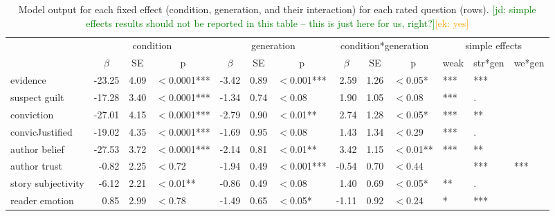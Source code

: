 \documentclass[10pt,letterpaper]{article}
\newcommand{\ek}[1]{\textcolor{Orange}{[ek: #1]}}
\newcommand{\jd}[1]{\textcolor{Green}{[jd: #1]}}
\begin{document}
	\begin{table}
		\centering
		\begin{tabular}{l r r l r r l r r l l l l}
			\toprule
			& \multicolumn{3}{c}{condition} & \multicolumn{3}{c}{generation} & \multicolumn{3}{c}{condition*generation} & \multicolumn{3}{c}{simple effects}\\
			& \multicolumn{1}{c}{$\beta$} & \multicolumn{1}{c}{SE} & \multicolumn{1}{c}{p} & \multicolumn{1}{c}{$\beta$} & \multicolumn{1}{c}{SE} & \multicolumn{1}{c}{p} & \multicolumn{1}{c}{$\beta$} & \multicolumn{1}{c}{SE} & \multicolumn{1}{c}{p} & \multicolumn{1}{c}{weak} & \multicolumn{1}{c}{str*gen} & \multicolumn{1}{c}{we*gen}\\
			\midrule
			evidence                  & -23.25 & 4.09 & $<$0.0001*** & -3.42 & 0.89 & $<$0.001*** & 2.59  & 1.26 & $<$0.05*  & *** & *** & \\
			suspect guilt          & -17.28  & 3.40 & $<$0.0001*** & -1.34 & 0.74 & $<$0.08           & 1.90  & 1.05 & $<$0.08 & *** & . & \\
			conviction               & -27.01 & 4.15  & $<$0.0001*** & -2.79 & 0.90 & $<$0.01**     & 2.74  & 1.28 & $<$0.05*  & *** & ** & \\
			convicJustified       & -19.02 & 4.35 & $<$0.0001***  & -1.69 & 0.95 & $<$0.08           & 1.43 & 1.34 & $<$0.29   & *** & . &  \\
			author belief            & -27.53 & 3.72 & $<$0.0001***  & -2.14 & 0.81 & $<$0.01**      & 3.42  & 1.15 & $<$0.01** & *** & ** & \\
			author trust            & -0.82   & 2.25 & $<$0.72           & -1.94 & 0.49 & $<$0.001*** & -0.54 & 0.70 & $<$0.44   & & *** & *** \\
			story subjectivity     & -6.12   & 2.21 & $<$0.01**          & -0.86 & 0.49 & $<$0.08         & 1.40   & 0.69 & $<$0.05* & ** & . & \\
			reader emotion        & 0.85   & 2.99 & $<$0.78            & -1.49 & 0.65 & $<$0.05*     & -1.11  & 0.92 & $<$0.24  & * & *** & \\
					\bottomrule
		\end{tabular}
		\caption{Model output for each fixed effect (condition, generation, and their interaction) for each rated question (rows). \jd{simple effects results should not be reported in this table -- this is just here for us, right?}\ek{yes}}
		\label{tab:exp2results}
	\end{table}
\end{document}

